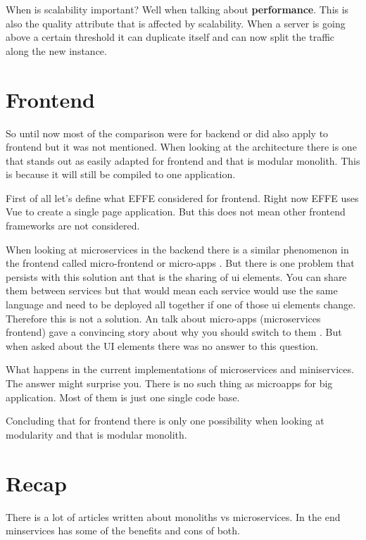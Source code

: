 When is scalability important? Well when talking about \textbf{performance}. This is also the quality attribute that is affected by scalability. When a server is going above a certain threshold it can duplicate itself and can now split the traffic along the new instance.

\section{Frontend}
\label{sec:Frontend}

So until now most of the comparison were for backend or did also apply to frontend but it was not mentioned. When looking at the architecture there is one that stands out as easily adapted for frontend and that is modular monolith. This is because it will still be compiled to one application.

First of all let’s define what EFFE considered for frontend. Right now EFFE uses Vue to create a single page application. But this does not mean other frontend frameworks are not considered.

When looking at microservices in the backend there is a similar phenomenon in the frontend called micro-frontend or micro-apps \cite{microFrontends}. But there is one problem that persists with this solution ant that is the sharing of ui elements. You can share them between services but that would mean each service would use the same language and need to be deployed all together if one of those ui elements change. Therefore this is not a solution. An talk about micro-apps (microservices frontend) gave a convincing story about why you should switch to them \cite{frontendMicroservices}. But when asked about the UI elements there was no answer to this question.

What happens in the current implementations of microservices and miniservices. The answer might surprise you. There is no such thing as microapps for big application. Most of them is just one single code base.

Concluding that for frontend there is only one possibility when looking at modularity and that is modular monolith.

\section{Recap}

There is a lot of articles written about monoliths vs microservices. In the end minservices has some of the benefits and cons of both.

